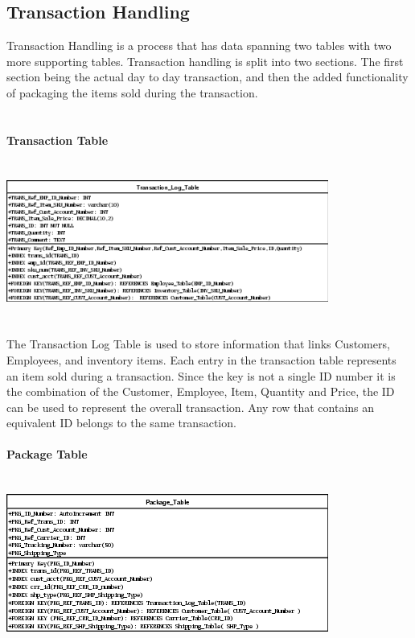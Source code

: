 \documentclass{report}
\begin{document}
    \subsection{Transaction Handling}

    Transaction Handling is a process that has data spanning two tables with two more supporting
    tables. Transaction handling is split into two sections. The first section being the actual
    day to day transaction, and then the added functionality of packaging the items sold during
    the transaction.\\
    \\
    \\
    {\bf Transaction Table}\\
    \\
    \\
    \includegraphics{Tables/TransactionLogTable.png}\\
    \\
    \\
    The Transaction Log Table is used to store information that links Customers, Employees, and
    inventory items. Each entry in the transaction table represents an item sold during a transaction.
    Since the key is not a single ID number it is the combination of the Customer, Employee, Item,
    Quantity and Price, the ID can be used to represent the overall transaction. Any row that contains
    an equivalent ID belongs to the same transaction.
    \\
    \\
    {\bf Package Table}\\
    \\
    \\
    \includegraphics{Tables/PackageTable.png}\\
\end{document}
